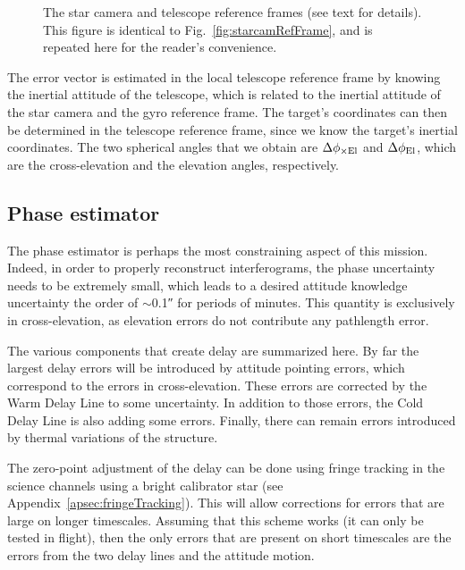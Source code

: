 \begin{figure}[!ht]
	\centering
	
	\caption[The star camera reference frame]{The star camera and telescope reference frames (see text for details). This figure is identical to Fig.~\ref{fig:starcamRefFrame}, and is repeated here for the reader's convenience.}
	\label{fig:starcamRefFrame2}
  \end{figure}

The error vector is estimated in the local telescope reference frame by knowing the inertial attitude of the telescope, which is related to the inertial attitude of the star camera and the gyro reference frame. The target's coordinates can then be determined in the telescope reference frame, since we know the target's inertial coordinates. The two spherical angles that we obtain are $\Delta\phi_{\times\textrm{El}}$ and $\Delta\phi_\textrm{El}$, which are the cross-elevation and the elevation angles, respectively. 


\subsection{Phase estimator}

The phase estimator is perhaps the most constraining aspect of this mission. Indeed, in order to properly reconstruct interferograms, the phase uncertainty needs to be extremely small, which leads to a desired attitude knowledge uncertainty the order of $\sim$\ang{;;0.1} for periods of minutes. This quantity is exclusively in cross-elevation, as elevation errors do not contribute any pathlength error. 

The various components that create delay are summarized here. By far the largest delay errors will be introduced by attitude pointing errors, which correspond to the errors in cross-elevation. These errors are corrected by the Warm Delay Line to some uncertainty. In addition to those errors, the Cold Delay Line is also adding some errors. Finally, there can remain errors introduced by thermal variations of the structure.

The zero-point adjustment of the delay can be done using fringe tracking in the science channels using a bright calibrator star (see Appendix~\ref{apsec:fringeTracking}). This will allow corrections for errors that are large on longer timescales. Assuming that this scheme works (it can only be tested in flight), then the only errors that are present on short timescales are the errors from the two delay lines and the attitude motion. 

